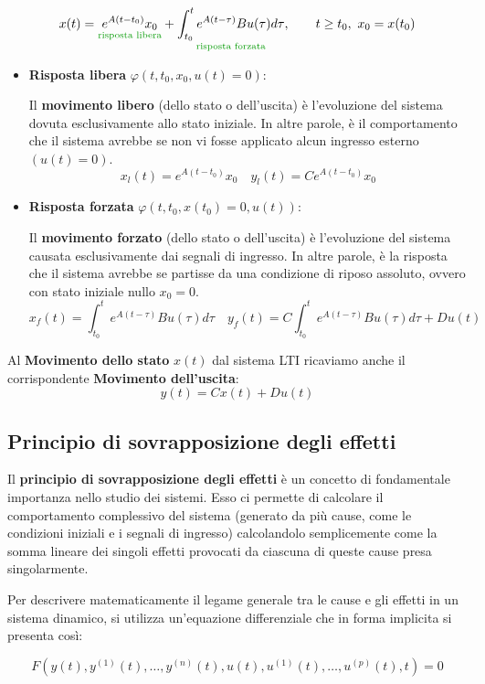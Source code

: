 \documentclass[a4paper,12pt]{article}
\begin{document}
	\[
	x(t) = \underset{\textcolor{green!60!black}{\text{risposta libera}}}{e^{A(t-t_0)}x_0} + \underset{\textcolor{green!60!black}{\text{risposta forzata}}}{\int_{t_0}^{t} e^{A(t-\tau)}Bu(\tau)d\tau}, \qquad t \geq t_0, \ x_0 = x(t_0)
	\]
	\begin{itemize}
		\item \textbf{Risposta libera} $\varphi(t, t_0, x_0, u(t) = 0)$:
		
		Il \textbf{movimento libero} (dello stato o dell'uscita) è l'evoluzione del sistema dovuta esclusivamente allo stato iniziale. In altre parole, è il comportamento che il sistema avrebbe se non vi fosse applicato alcun ingresso esterno $(u(t) = 0)$. 
		\[
		x_l(t) = e^{A(t-t_0)}x_0 \quad y_l(t) = Ce^{A(t-t_0)}x_0
		\]
		
		\item \textbf{Risposta forzata} $\varphi(t, t_0, x(t_0) = 0, u(t))$:
		
		Il \textbf{movimento forzato} (dello stato o dell'uscita) è l'evoluzione del sistema causata esclusivamente dai segnali di ingresso. In altre parole, è la risposta che il sistema avrebbe se partisse da una condizione di riposo assoluto, ovvero con stato iniziale nullo $x_0 = 0$.
		\[
			x_f(t) = \int_{t_0}^{t} e^{A(t-\tau)}Bu(\tau)d\tau \quad y_f(t) = C \int_{t_0}^{t} e^{A(t-\tau)}Bu(\tau)d\tau + Du(t)
		\]
	\end{itemize}
	Al \textbf{Movimento dello stato} $x(t)$ dal sistema LTI ricaviamo anche il corrispondente \textbf{Movimento dell'uscita}:
	\[
	y(t) = Cx(t) + Du(t)
	\]
	
	\subsection{Principio di sovrapposizione degli effetti}
	
	Il \textbf{principio di sovrapposizione degli effetti} è un concetto di fondamentale importanza nello studio dei sistemi. Esso ci permette di calcolare il comportamento complessivo del sistema (generato da più cause, come le condizioni iniziali e i segnali di ingresso) calcolandolo semplicemente come la somma lineare dei singoli effetti provocati da ciascuna di queste cause presa singolarmente.
	
	Per descrivere matematicamente il legame generale tra le cause e gli effetti in un sistema dinamico, si utilizza un'equazione differenziale che in forma implicita si presenta così:
	
	\[
	F(y(t), y^{(1)}(t), \dots, y^{(n)}(t), u(t), u^{(1)}(t), \dots, u^{(p)}(t), t) = 0
	\]
	
\end{document}
